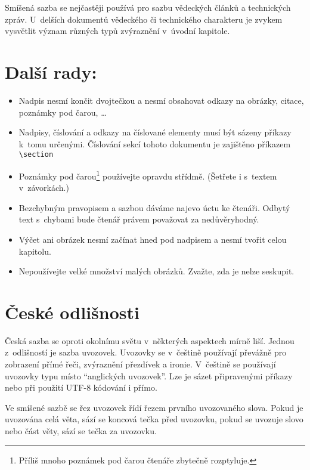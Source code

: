 \documentclass[hidelinks, twocolumn, 10pt, a4paper]{article}[24.02.2022]
\begin{document}
            Smíšená sazba se nejčastěji používá pro sazbu vědeckých článků a technických zpráv. U~delších dokumentů vědeckého či technického charakteru je zvykem vysvětlit význam různých typů zvýraznění v~úvodní kapitole.
            
        \section{Další rady:}
            \begin{itemize}
                \item Nadpis nesmí končit dvojtečkou a nesmí obsahovat odkazy na obrázky, citace, poznámky pod čarou, \dots
                \item Nadpisy, číslování a odkazy na číslované elementy musí být sázeny příkazy k~tomu určenými. Číslování sekcí tohoto dokumentu je zajištěno příkazem \verb|\section|
                \item Poznámky pod čarou\footnote[1]{Příliš mnoho poznámek pod čarou čtenáře zbytečně rozptyluje.} používejte opravdu střídmě. (Šetřete i s~textem v~závorkách.)
                \item Bezchybným pravopisem a sazbou dáváme najevo úctu ke čtenáři. Odbytý text s~chybami bude čtenář právem považovat za nedůvěryhodný.
                \item Výčet ani obrázek nesmí začínat hned pod nadpisem a nesmí tvořit celou kapitolu.
                \item Nepoužívejte velké množství malých obrázků. Zvažte, zda je nelze seskupit.
            \end{itemize}
            
        \section{České odlišnosti}
            Česká sazba se oproti okolnímu světu v~některých aspektech mírně liší. Jednou z~odlišností je sazba uvozovek. Uvozovky se v~češtině používají převážně pro zobrazení přímé řeči, zvýraznění přezdívek a ironie. V~češtině se používají uvozovky typu  místo ``anglických uvozovek''. Lze je sázet připravenými příkazy nebo při použití UTF-8 kódování i přímo. 
            
            Ve smíšené sazbě se řez uvozovek řídí řezem prvního uvozovaného slova. Pokud je uvozována celá věta, sází se koncová tečka před uvozovku, pokud se uvozuje slovo nebo část věty, sází se tečka za uvozovku. 
            
\end{document}
